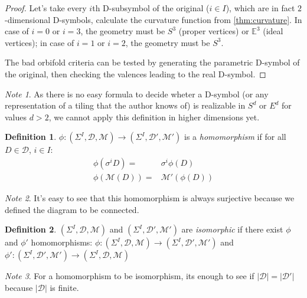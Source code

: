 \documentclass[12pt,a4paper]{article}
\theoremstyle{plain}%
\theoremstyle{definition}
\newtheorem{defn}{Definition}[section]
\theoremstyle{remark}
\newtheorem*{note}{Note}
\begin{document}
\begin{proof}
  Let's take every $i$th D-subsymbol of the original ($i\in I$), which are in
  fact $2$-dimensional D-symbols, calculate the curvature function from
  \ref{thm:curvature}. In case of $i=0$ or $i=3$, the geometry must be $S^3$
  (proper vertices) or $\mathbb{E}^3$ (ideal vertices); in case of $i=1$ or $i=2$, the
  geometry must be $S^3$.

  The bad orbifold criteria can be tested by generating the parametric D-symbol
  of the original, then checking the valences leading to the real D-symbol.
\end{proof}

\begin{note}
  As there is no easy formula to decide wheter a D-symbol (or any representation
  of a tiling that the author knows of) is realizable in $S^d$ or $E^d$ for
  values $d>2$, we cannot apply this definition in higher dimensions yet.
\end{note}

\begin{defn}
  $\phi: (\Sigma^I,\mathcal{D},\mathcal{M}) \rightarrow
  (\Sigma^I,\mathcal{D}',\mathcal{M}')$ is a {\em homomorphism} if for all $D\in
  \mathcal{D}$, $i \in I$:
  \begin{align}
    \phi(\sigma^iD)= & \sigma^i\phi(D) \\
    \phi(\mathcal{M}(D))= & \mathcal{M}'(\phi(D))
  \end{align}
\end{defn}

\begin{note}
  It's easy to see that this homomorphism is always surjective because we
  defined the diagram to be connected.
\end{note}

\begin{defn}
  $(\Sigma^I,\mathcal{D},\mathcal{M})$ and
  $(\Sigma^I,\mathcal{D}',\mathcal{M}')$ are {\em isomorphic} if there exist $\phi$ and
  $\phi'$ homomorphisms: $\phi: (\Sigma^I,\mathcal{D},\mathcal{M}) \rightarrow
  (\Sigma^I,\mathcal{D}',\mathcal{M}')$ and $\phi':
  (\Sigma^I,\mathcal{D}',\mathcal{M}') \rightarrow
  (\Sigma^I,\mathcal{D},\mathcal{M})$
\end{defn}

\begin{note}
  For a homomorphism to be isomorphism, its enough to see if
  $|\mathcal{D}|=|\mathcal{D}'|$ because $|\mathcal{D}|$ is finite.
\end{note}
\end{document}
